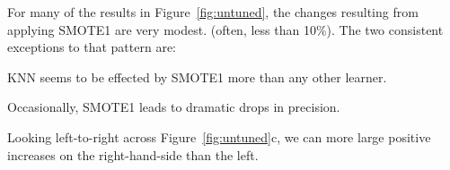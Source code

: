 For many of the results in  Figure~\ref{fig:untuned}, the changes
resulting from applying SMOTE1 are very modest. (often, less than 10\%).
The two consistent exceptions to that pattern are:
\bi
\item 
KNN seems to be effected by SMOTE1 more than any other learner.
\item 
Occasionally, SMOTE1 leads to dramatic drops in precision.
\item 
Looking left-to-right across
Figure~\ref{fig:untuned}c, we can more
large positive increases on the
right-hand-side than the left.   
\ei







